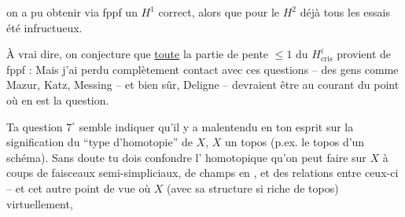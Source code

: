 on a pu obtenir via fppf un $H^1$ correct, alors que pour le $H^2$ déjà tous les essais  été infructueux.

À vrai dire, on conjecture que \uline{toute} la partie de pente $\leq 1$ du $H^i_{\mathrm{cris}}$ provient de fppf : Mais j'ai perdu complètement contact avec ces questions -- des gens comme Mazur, Katz, Messing -- et bien sûr, Deligne -- devraient être au courant du point où en est la question.


Ta question $7^{\circ}$ semble indiquer qu'il y a malentendu en ton esprit sur la signification du ``type d'homotopie'' de $X$, $X$ un topos (p.ex. le topos  d'un schéma). Sans doute tu dois confondre l' homotopique qu'on peut faire sur $X$ à coups de faisceaux semi-simpliciaux, de champs en  , et des relations entre ceux-ci -- et cet autre point de vue où $X$ (avec sa structure si riche de topos)  virtuellement,

